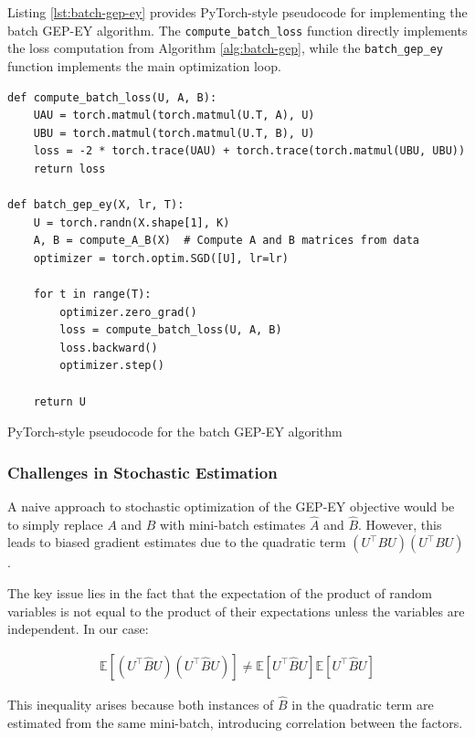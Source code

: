 Listing \ref{lst:batch-gep-ey} provides PyTorch-style pseudocode for implementing the batch GEP-EY algorithm. The \texttt{compute\_batch\_loss} function directly implements the loss computation from Algorithm \ref{alg:batch-gep}, while the \texttt{batch\_gep\_ey} function implements the main optimization loop.

\begin{listing}[ht]
\begin{verbatim}
def compute_batch_loss(U, A, B):
    UAU = torch.matmul(torch.matmul(U.T, A), U)
    UBU = torch.matmul(torch.matmul(U.T, B), U)
    loss = -2 * torch.trace(UAU) + torch.trace(torch.matmul(UBU, UBU))
    return loss

def batch_gep_ey(X, lr, T):
    U = torch.randn(X.shape[1], K)
    A, B = compute_A_B(X)  # Compute A and B matrices from data
    optimizer = torch.optim.SGD([U], lr=lr)
    
    for t in range(T):
        optimizer.zero_grad()
        loss = compute_batch_loss(U, A, B)
        loss.backward()
        optimizer.step()
    
    return U
\end{verbatim}
\caption{PyTorch-style pseudocode for the batch GEP-EY algorithm}
\label{lst:batch-gep-ey}
\end{listing}

\subsubsection{Challenges in Stochastic Estimation}

A naive approach to stochastic optimization of the GEP-EY objective would be to simply replace $A$ and $B$ with mini-batch estimates $\hat{A}$ and $\hat{B}$. However, this leads to biased gradient estimates due to the quadratic term $(U^\top B U)(U^\top B U)$. 

The key issue lies in the fact that the expectation of the product of random variables is not equal to the product of their expectations unless the variables are independent. In our case:

\begin{align}
\mathbb{E}[(U^\top \hat{B} U)(U^\top \hat{B} U)] \neq \mathbb{E}[U^\top \hat{B} U] \mathbb{E}[U^\top \hat{B} U]
\end{align}

This inequality arises because both instances of $\hat{B}$ in the quadratic term are estimated from the same mini-batch, introducing correlation between the factors.

